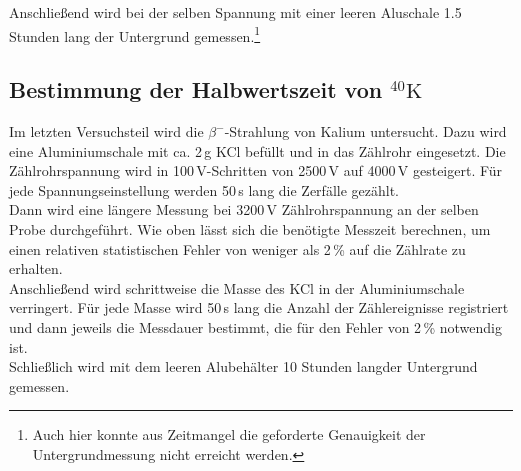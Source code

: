 Anschließend wird bei der selben Spannung mit einer leeren Aluschale 1.5 Stunden lang
der Untergrund gemessen.\footnote{Auch hier konnte aus Zeitmangel
die geforderte Genauigkeit der Untergrundmessung
nicht erreicht werden.}





\subsection{Bestimmung der Halbwertszeit von \texorpdfstring{${}^{40}\text{K}$}{K-40}}
Im letzten Versuchsteil wird die $\beta^-$-Strahlung von Kalium untersucht.
Dazu wird eine Aluminiumschale mit ca. 2\,g KCl befüllt und in das Zählrohr
eingesetzt. Die Zählrohrspannung wird in 100\,V-Schritten von 2500\,V auf
4000\,V gesteigert. Für jede Spannungseinstellung werden 50\,s lang die Zerfälle
gezählt.\\
Dann wird eine längere Messung bei 3200\,V Zählrohrspannung an der
selben Probe durchgeführt. Wie oben lässt sich die
benötigte Messzeit berechnen, um einen relativen statistischen
Fehler von weniger als 2\,\% auf die Zählrate zu erhalten.\\
Anschließend wird schrittweise die Masse des KCl in der Aluminiumschale
verringert. Für jede Masse wird 50\,s lang die Anzahl der Zählereignisse
registriert und dann jeweils die Messdauer bestimmt, die für den Fehler von
2\,\% notwendig ist.\\
Schließlich wird mit dem leeren Alubehälter 10 Stunden lang\footnotemark[2] der Untergrund gemessen.


